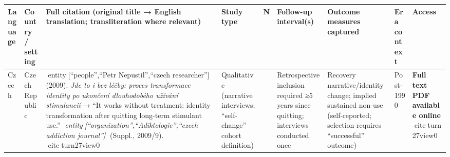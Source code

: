 {\def\LTcaptype{none} %
\begin{longtable}[]{@{}
  >{\raggedright\arraybackslash}p{}
  >{\raggedright\arraybackslash}p{}
  >{\raggedright\arraybackslash}p{}
  >{\raggedright\arraybackslash}p{}
  >{\raggedleft\arraybackslash}p{}
  >{\raggedright\arraybackslash}p{}
  >{\raggedright\arraybackslash}p{}
  >{\raggedright\arraybackslash}p{}
  >{\raggedright\arraybackslash}p{}@{}}
\toprule\noalign{}
\begin{minipage}[b]{\linewidth}\raggedright
Language
\end{minipage} & \begin{minipage}[b]{\linewidth}\raggedright
Country / setting
\end{minipage} & \begin{minipage}[b]{\linewidth}\raggedright
Full citation (original title → English translation; transliteration where relevant)
\end{minipage} & \begin{minipage}[b]{\linewidth}\raggedright
Study type
\end{minipage} & \begin{minipage}[b]{\linewidth}\raggedleft
N
\end{minipage} & \begin{minipage}[b]{\linewidth}\raggedright
Follow-up interval(s)
\end{minipage} & \begin{minipage}[b]{\linewidth}\raggedright
Outcome measures captured
\end{minipage} & \begin{minipage}[b]{\linewidth}\raggedright
Era context
\end{minipage} & \begin{minipage}[b]{\linewidth}\raggedright
Access
\end{minipage} \\
\midrule\noalign{}
\endhead
\bottomrule\noalign{}
\endlastfoot
Czech & Czech Republic & entity{[}``people'',``Petr Nepustil'',``czech researcher''{]} (2009). \emph{Jde to i bez léčby: proces transformace identity po ukončení dlouhodobého užívání stimulancií} → ``It works without treatment: identity transformation after quitting long-term stimulant use.'' \emph{entity{[}``organization'',``Adiktologie'',``czech addiction journal''{]}} (Suppl., 2009/9). citeturn27view0 & Qualitative (narrative interviews; ``self-change'' cohort definition) & 20 & Retrospective inclusion required ≥5 years since quitting; interviews conducted once & Recovery narrative/identity change; implied sustained non‑use (self‑reported; selection requires ``successful'' outcome) & Post‑1990 & \textbf{Full text PDF available online} citeturn27view0 \\

\end{longtable}}
